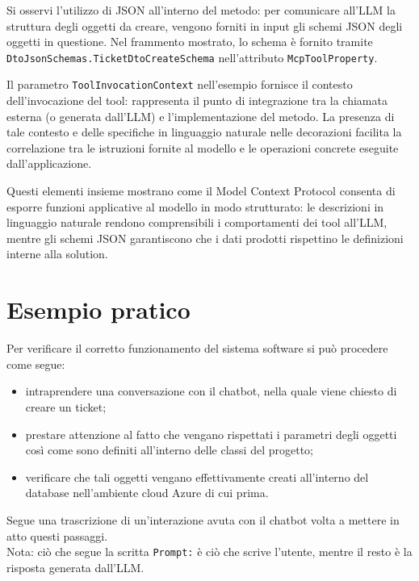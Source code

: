 Si osservi l'utilizzo di JSON all'interno del metodo: per comunicare all'LLM la struttura degli oggetti da creare, vengono forniti in input
gli schemi JSON degli oggetti in questione. Nel frammento mostrato, lo schema è fornito tramite \texttt{DtoJsonSchemas.TicketDtoCreateSchema}
nell'attributo \texttt{McpToolProperty}.

Il parametro \texttt{ToolInvocationContext} nell'esempio fornisce il contesto dell'invocazione del tool:
rappresenta il punto di integrazione tra la chiamata esterna (o generata dall'LLM) e l'implementazione del metodo.
La presenza di tale contesto e delle specifiche in linguaggio naturale nelle decorazioni facilita la correlazione tra le istruzioni fornite al modello
e le operazioni concrete eseguite dall'applicazione.

Questi elementi insieme mostrano come il Model Context Protocol consenta di esporre funzioni applicative al modello in modo strutturato:
le descrizioni in linguaggio naturale rendono comprensibili i comportamenti dei tool all'LLM, mentre gli schemi JSON garantiscono che i dati prodotti
rispettino le definizioni interne alla solution.

\section{Esempio pratico}
Per verificare il corretto funzionamento del sistema software si può procedere come segue:
\begin{itemize}
    \item intraprendere una conversazione con il chatbot, nella quale viene chiesto di creare un ticket;
    \item prestare attenzione al fatto che vengano rispettati i parametri degli oggetti così come sono definiti all'interno delle classi del progetto;
    \item verificare che tali oggetti vengano effettivamente creati all'interno del database nell'ambiente cloud Azure di cui prima.
\end{itemize}
Segue una trascrizione di un'interazione avuta con il chatbot volta a mettere in atto questi passaggi. \\
Nota: ciò che segue la scritta \texttt{Prompt:} è ciò che scrive l'utente, mentre il resto è la risposta generata dall'LLM.

